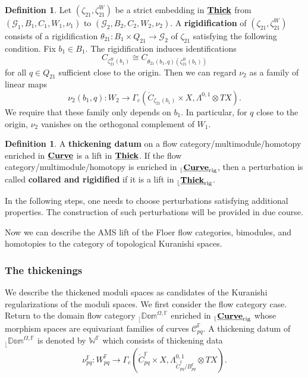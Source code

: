 \documentclass[reqno, 10pt]{amsart}
\numberwithin{equation}{section}
\numberwithin{equation}{section}
\theoremstyle{definition}
\newtheorem{defn}[thm]{Definition}
\theoremstyle{remark}
\newcommand{\beqn}{\begin{equation*}}
\newcommand{\eeqn}{\end{equation*}}
\newcommand{\mb}{\mathbb}
\newcommand{\mc}{\mathcal}
\renewcommand{\outer}{{}_{\lfloor}}
\newcommand{\uds}[1]{\underline{\smash{#1}}}
\begin{document}
\begin{defn}
Let $(\zeta_{21}, \zeta_{21}^W)$ be a strict embedding in $\uds{\bf Thick}$ from $({\mc G}_1, B_1, C_1, W_1, \nu_1)$ to $({\mc G}_2, B_2, C_2, W_2, \nu_2)$. A {\bf rigidification} of $(\zeta_{21}, \zeta_{21}^W)$ consists of a rigidification $\theta_{21}: B_1 \times Q_{21} \to {\mc G}_2$ of $\zeta_{21}$ satisfying the following condition. Fix $b_1 \in B_1$. The rigidification induces identifications
\beqn
C_{\zeta_{21}^B(b_1)} \cong C_{\theta_{21}(b_1, q)( \zeta_{21}^B (b_1))}
\eeqn
for all $q \in Q_{21}$ sufficient close to the origin. Then we can regard $\nu_2$ as a family of linear maps
\beqn
\nu_2(b_1, q): W_2 \to \Gamma_c( \mathring C_{\zeta_{21}(b_1)} \times X, \Lambda^{0,1} \otimes TX).
\eeqn
We require that these family only depends on $b_1$. In particular, for $q$ close to the origin, $\nu_2$ vanishes on the orthogonal complement of $W_1$.
\end{defn}








\begin{defn}
A {\bf thickening datum} on a flow category/multimodule/homotopy enriched in $\uds{\bf Curve}$ is a lift in $\uds{\bf Thick}$. If the flow category/multimodule/homotopy is enriched in $\outer \uds{\bf Curve}_{\rm rig}$, then a perturbation is called {\bf collared and rigidified} if it is a lift in $\outer\uds{\bf Thick}_{\rm rig}$.
\end{defn}

In the following steps, one needs to choose perturbations satisfying additional properties. The construction of such perturbations will be provided in due course.







Now we can describe the AMS lift of the Floer flow categories, bimodules, and homotopies to the category of topological Kuranishi spaces.

\subsubsection{The thickenings}

We describe the thickened moduli spaces as candidates of the Kuranishi regularizations of the moduli spaces. We first consider the flow category case. Return to the domain flow category $\outer \mb{Dom}^{\Omega, {\mb F}}$ enriched in $\outer\uds{\bf Curve}_{\rm rig}$ whose morphism spaces are equivariant families of curves ${\mc C}_{pq}^{\mb F}$. A thickening datum of $\outer \mb{Dom}^{\Omega, {\mb F}}$ is denoted by $\mb{W}^{\mb F}$ which consists of thickening data
\beqn
\nu_{pq}^{\mb F}: W_{pq}^{\mb F} \to \Gamma_c ( \mathring C_{pq}^{\mb F} \times X, \Lambda_{\mathring C_{pq}^{\mb F}/ B_{pq}^{\mb F}}^{0,1}\otimes TX).
\eeqn
\end{document}
